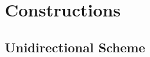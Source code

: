 \documentclass[11pt]{report}
\begin{document}
%
%
%


\section{Constructions}
\label{sec:constructs}

\subsection{Unidirectional Scheme}
\label{sec:unidirectional}
\end{document}
